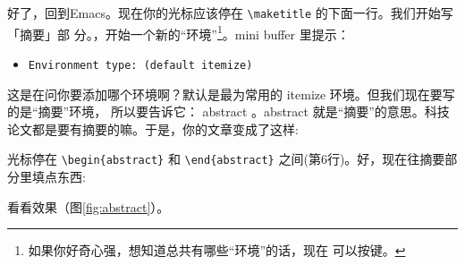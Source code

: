 好了，回到Emacs。现在你的光标应该停在 \verb|\maketitle| 的下面一行。我们开始写「摘要」部
分。，开始一个新的“环境”\footnote{如果你好奇心强，想知道总共有哪些“环境”的话，现在
  可以按{\LKeyTab}键。}。mini buffer 里提示：

\begin{itemize}
\item[] \texttt{Environment type: (default itemize)}
\end{itemize}

这是在问你要添加哪个环境啊？默认是最为常用的 itemize 环境。但我们现在要写的是“摘要”环境，
所以要告诉它：
abstract 。abstract 就是“摘要”的意思。科技论文都是要有摘要的嘛。于是，你的文章变成了这样:
\begin{codeblock}[.9]
\begin{latexcode}
 
  \maketitle
 
  \begin{abstract} 
    |
  \end{abstract}
\end{latexcode}
\end{codeblock}
光标停在 \verb|\begin{abstract}| 和 \verb|\end{abstract}| 之间(第6行)。好，现在往摘要部分里填点东西:
\begin{codeblock}[.9]
\begin{latexcode}
 
  \maketitle
 
  \begin{abstract} 
    In this article, I shall discuss some of the fundamental
    topics in producing a structured document.  This
    document itself does not go into much depth, but is
    instead the output of an example of how to implement
    structure. Its \LaTeX{} source, when in used with
    my tutorial provides all the relevant information.
  \end{abstract}
\end{latexcode}
\end{codeblock}
看看效果（图\ref{fig:abstract}）。


